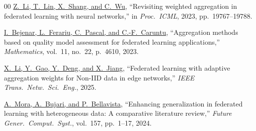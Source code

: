 \begin{thebibliography}{00}
\href{https://proceedings.mlr.press/v202/li23s.html}{Z.~Li,
T.~Lin, X.~Shang, and C.~Wu},
``Revisiting weighted aggregation in federated
learning with neural networks,''
in \textit{Proc.\ ICML}, 2023, pp.~19767--19788.

\href{https://doi.org/10.3390/math11224610}{I.~Bejenar,
L.~Ferariu, C.~Pascal, and C.-F.~Caruntu},
``Aggregation methods based on quality model assessment
for federated learning applications,''
\textit{Mathematics}, vol.~11, no.~22, p.~4610, 2023.

\href{https://ieeexplore.ieee.org/document/10854512}{X.~Li,
Y.~Gao, Y.~Deng, and X.~Jiang},
``Federated learning with adaptive aggregation weights
for Non-IID data in edge networks,''
\textit{IEEE Trans.\ Netw.\ Sci.\ Eng.}, 2025.

\href{https://doi.org/10.1016/j.future.2024.01.033}{A.~Mora,
A.~Bujari, and P.~Bellavista},
``Enhancing generalization in federated learning with
heterogeneous data: A comparative literature review,''
\textit{Future Gener.\ Comput.\ Syst.},
vol.~157, pp.~1--17, 2024.

\end{thebibliography}
